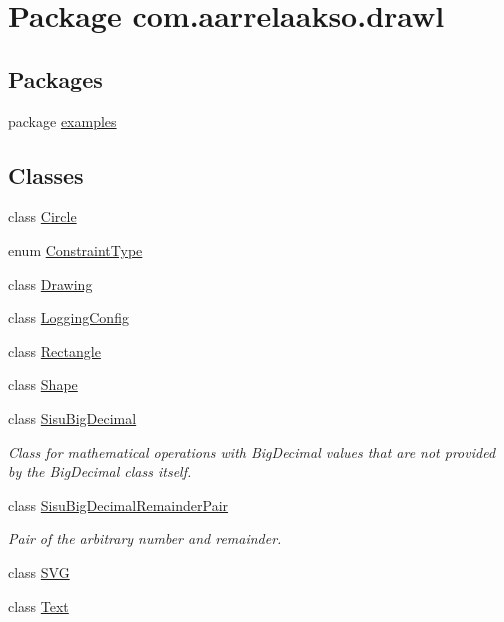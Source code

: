\hypertarget{namespacecom_1_1aarrelaakso_1_1drawl}{}\section{Package com.\+aarrelaakso.\+drawl}
\label{namespacecom_1_1aarrelaakso_1_1drawl}
\subsection*{Packages}
\begin{DoxyCompactItemize}
\item 
package \hyperlink{namespacecom_1_1aarrelaakso_1_1drawl_1_1examples}{examples}
\end{DoxyCompactItemize}
\subsection*{Classes}
\begin{DoxyCompactItemize}
\item 
class \hyperlink{classcom_1_1aarrelaakso_1_1drawl_1_1_circle}{Circle}
\item 
enum \hyperlink{enumcom_1_1aarrelaakso_1_1drawl_1_1_constraint_type}{Constraint\+Type}
\item 
class \hyperlink{classcom_1_1aarrelaakso_1_1drawl_1_1_drawing}{Drawing}
\item 
class \hyperlink{classcom_1_1aarrelaakso_1_1drawl_1_1_logging_config}{Logging\+Config}
\item 
class \hyperlink{classcom_1_1aarrelaakso_1_1drawl_1_1_rectangle}{Rectangle}
\item 
class \hyperlink{classcom_1_1aarrelaakso_1_1drawl_1_1_shape}{Shape}
\item 
class \hyperlink{classcom_1_1aarrelaakso_1_1drawl_1_1_sisu_big_decimal}{Sisu\+Big\+Decimal}
\begin{DoxyCompactList}\small\item\em Class for mathematical operations with Big\+Decimal values that are not provided by the Big\+Decimal class itself. \end{DoxyCompactList}\item 
class \hyperlink{classcom_1_1aarrelaakso_1_1drawl_1_1_sisu_big_decimal_remainder_pair}{Sisu\+Big\+Decimal\+Remainder\+Pair}
\begin{DoxyCompactList}\small\item\em Pair of the arbitrary number and remainder. \end{DoxyCompactList}\item 
class \hyperlink{classcom_1_1aarrelaakso_1_1drawl_1_1_s_v_g}{S\+VG}
\item 
class \hyperlink{classcom_1_1aarrelaakso_1_1drawl_1_1_text}{Text}
\end{DoxyCompactItemize}

